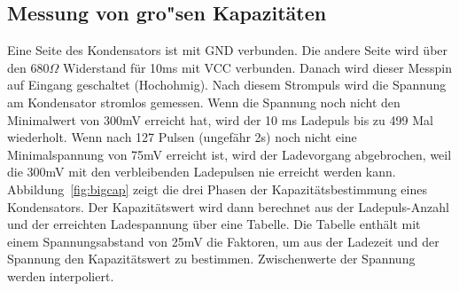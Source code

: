 \subsection{Messung von gro"sen Kapazit\"aten}
\label{sec:bigcap}
Eine Seite des Kondensators ist mit GND verbunden. Die andere Seite wird \"uber den \(680\Omega\) Widerstand f\"ur 10ms mit VCC verbunden.
Danach wird dieser Messpin auf Eingang geschaltet (Hochohmig).
Nach diesem Strompuls wird die Spannung am Kondensator stromlos gemessen.
Wenn die Spannung noch nicht den Minimalwert von 300mV erreicht hat, wird der 10 ms Ladepuls bis zu 499 Mal wiederholt.
Wenn nach 127 Pulsen (ungef\"ahr 2s) noch nicht eine Minimalspannung von 75mV erreicht ist, wird der Ladevorgang abgebrochen,
 weil die 300mV mit den verbleibenden Ladepulsen nie erreicht werden kann.
Abbildung~\ref{fig:bigcap} zeigt die drei Phasen der Kapazit\"atsbestimmung eines Kondensators.
Der Kapazit\"atswert wird dann berechnet aus der Ladepuls-Anzahl und der erreichten Ladespannung \"uber eine Tabelle.
Die Tabelle enth\"alt mit einem Spannungsabstand von 25mV die Faktoren, um aus der Ladezeit und der Spannung 
den Kapazit\"atswert zu bestimmen. 
Zwischenwerte der Spannung werden interpoliert.

